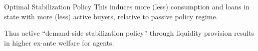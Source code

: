 \documentclass[10pt,english,slidetop,compress,
              blue,mathserif,color=option]{beamer}
\theoremstyle{plain}
\theoremstyle{definition}
\begin{document}
\begin{frame}[allowframebreaks]{Optimal Stabilization Policy}
    This induces more (less) consumption and loans in state with more (less)
    active buyers, relative to passive policy regime.  

    \bigskip
    
    Thus active ``demand-side stabilization policy'' through liquidity provision results in higher ex-ante welfare for agents.



  
     




      
      
      
      


\end{frame}
\end{document}
